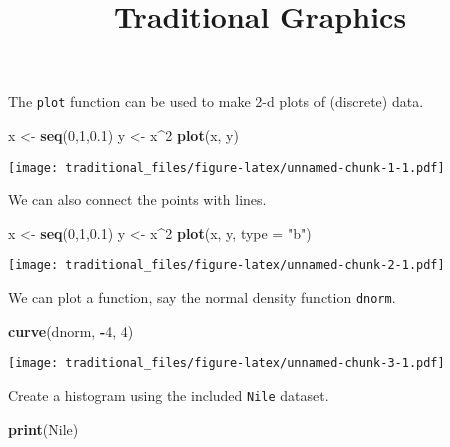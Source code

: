 \documentclass[]{article}
\title{Traditional Graphics}
\author{}
\date{}
\newenvironment{Shaded}{\begin{snugshade}}{\end{snugshade}}
\newcommand{\KeywordTok}[1]{\textcolor[rgb]{0.13,0.29,0.53}{\textbf{#1}}}
\newcommand{\DataTypeTok}[1]{\textcolor[rgb]{0.13,0.29,0.53}{#1}}
\newcommand{\DecValTok}[1]{\textcolor[rgb]{0.00,0.00,0.81}{#1}}
\newcommand{\FloatTok}[1]{\textcolor[rgb]{0.00,0.00,0.81}{#1}}
\newcommand{\StringTok}[1]{\textcolor[rgb]{0.31,0.60,0.02}{#1}}
\newcommand{\OperatorTok}[1]{\textcolor[rgb]{0.81,0.36,0.00}{\textbf{#1}}}
\newcommand{\NormalTok}[1]{#1}
\begin{document}
\maketitle

The \texttt{plot} function can be used to make 2-d plots of (discrete)
data.

\begin{Shaded}
\begin{Highlighting}[]
\NormalTok{x <-}\StringTok{ }\KeywordTok{seq}\NormalTok{(}\DecValTok{0}\NormalTok{,}\DecValTok{1}\NormalTok{,}\FloatTok{0.1}\NormalTok{)}
\NormalTok{y <-}\StringTok{ }\NormalTok{x}\OperatorTok{^}\DecValTok{2}
\KeywordTok{plot}\NormalTok{(x, y)}
\end{Highlighting}
\end{Shaded}

\texttt{[image: traditional\_files/figure-latex/unnamed-chunk-1-1.pdf]}

We can also connect the points with lines.

\begin{Shaded}
\begin{Highlighting}[]
\NormalTok{x <-}\StringTok{ }\KeywordTok{seq}\NormalTok{(}\DecValTok{0}\NormalTok{,}\DecValTok{1}\NormalTok{,}\FloatTok{0.1}\NormalTok{)}
\NormalTok{y <-}\StringTok{ }\NormalTok{x}\OperatorTok{^}\DecValTok{2}
\KeywordTok{plot}\NormalTok{(x, y, }\DataTypeTok{type =} \StringTok{"b"}\NormalTok{)}
\end{Highlighting}
\end{Shaded}

\texttt{[image: traditional\_files/figure-latex/unnamed-chunk-2-1.pdf]}

We can plot a function, say the normal density function \texttt{dnorm}.

\begin{Shaded}
\begin{Highlighting}[]
\KeywordTok{curve}\NormalTok{(dnorm, }\OperatorTok{-}\DecValTok{4}\NormalTok{, }\DecValTok{4}\NormalTok{)}
\end{Highlighting}
\end{Shaded}

\texttt{[image: traditional\_files/figure-latex/unnamed-chunk-3-1.pdf]}

Create a histogram using the included \texttt{Nile} dataset.

\begin{Shaded}
\begin{Highlighting}[]
\KeywordTok{print}\NormalTok{(Nile)}
\end{Highlighting}
\end{Shaded}
\end{document}
